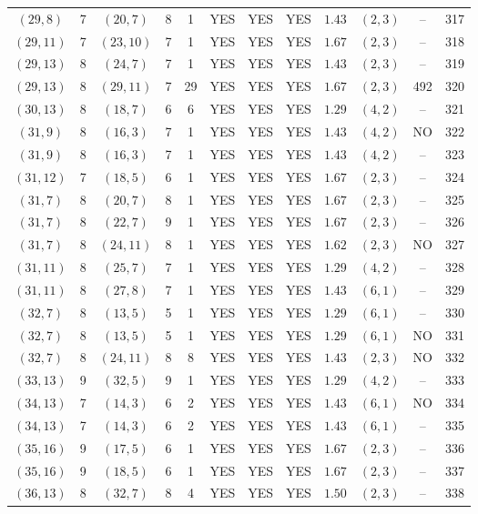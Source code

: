 \begin{longtable}{|c|c|c|c|c|c|c|c|c|c|c|c|}
$(29,8)$ & 7 & $(20,7)$ & 8 & 1 & YES & YES & YES & $1.43$ & $(2,3)$ & -- & 317\\
$(29,11)$ & 7 & $(23,10)$ & 7 & 1 & YES & YES & YES & $1.67$ & $(2,3)$ & -- & 318\\
$(29,13)$ & 8 & $(24,7)$ & 7 & 1 & YES & YES & YES & $1.43$ & $(2,3)$ & -- & 319\\
$(29,13)$ & 8 & $(29,11)$ & 7 & 29 & YES & YES & YES & $1.67$ & $(2,3)$ & 492 & 320\\
$(30,13)$ & 8 & $(18,7)$ & 6 & 6 & YES & YES & YES & $1.29$ & $(4,2)$ & -- & 321\\
$(31,9)$ & 8 & $(16,3)$ & 7 & 1 & YES & YES & YES & $1.43$ & $(4,2)$ & NO & 322\\
$(31,9)$ & 8 & $(16,3)$ & 7 & 1 & YES & YES & YES & $1.43$ & $(4,2)$ & -- & 323\\
$(31,12)$ & 7 & $(18,5)$ & 6 & 1 & YES & YES & YES & $1.67$ & $(2,3)$ & -- & 324\\
$(31,7)$ & 8 & $(20,7)$ & 8 & 1 & YES & YES & YES & $1.67$ & $(2,3)$ & -- & 325\\
$(31,7)$ & 8 & $(22,7)$ & 9 & 1 & YES & YES & YES & $1.67$ & $(2,3)$ & -- & 326\\
$(31,7)$ & 8 & $(24,11)$ & 8 & 1 & YES & YES & YES & $1.62$ & $(2,3)$ & NO & 327\\
$(31,11)$ & 8 & $(25,7)$ & 7 & 1 & YES & YES & YES & $1.29$ & $(4,2)$ & -- & 328\\
$(31,11)$ & 8 & $(27,8)$ & 7 & 1 & YES & YES & YES & $1.43$ & $(6,1)$ & -- & 329\\
$(32,7)$ & 8 & $(13,5)$ & 5 & 1 & YES & YES & YES & $1.29$ & $(6,1)$ & -- & 330\\
$(32,7)$ & 8 & $(13,5)$ & 5 & 1 & YES & YES & YES & $1.29$ & $(6,1)$ & NO & 331\\
$(32,7)$ & 8 & $(24,11)$ & 8 & 8 & YES & YES & YES & $1.43$ & $(2,3)$ & NO & 332\\
$(33,13)$ & 9 & $(32,5)$ & 9 & 1 & YES & YES & YES & $1.29$ & $(4,2)$ & -- & 333\\
$(34,13)$ & 7 & $(14,3)$ & 6 & 2 & YES & YES & YES & $1.43$ & $(6,1)$ & NO & 334\\
$(34,13)$ & 7 & $(14,3)$ & 6 & 2 & YES & YES & YES & $1.43$ & $(6,1)$ & -- & 335\\
$(35,16)$ & 9 & $(17,5)$ & 6 & 1 & YES & YES & YES & $1.67$ & $(2,3)$ & -- & 336\\
$(35,16)$ & 9 & $(18,5)$ & 6 & 1 & YES & YES & YES & $1.67$ & $(2,3)$ & -- & 337\\
$(36,13)$ & 8 & $(32,7)$ & 8 & 4 & YES & YES & YES & $1.50$ & $(2,3)$ & -- & 338\\

\end{longtable}
